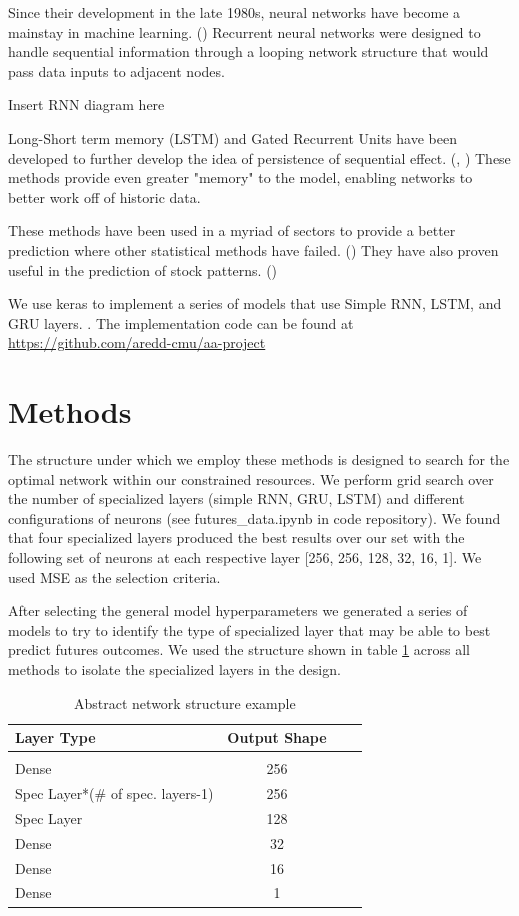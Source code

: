 \documentclass[twoside,11pt]{article}
\begin{document}
Since their development in the late 1980s, neural networks have become a mainstay in machine learning. (\cite{Schmidhuber2015}) Recurrent neural networks were designed to handle sequential information through a looping network structure that would pass data inputs to adjacent nodes. 

Insert RNN diagram here

Long-Short term memory (LSTM) and Gated Recurrent Units have been developed to further develop the idea of persistence of sequential effect. (\cite{Hochreiter1997}, \cite{Chung}) These methods provide even greater "memory" to the model, enabling networks to better work off of historic data. 

These methods have been used in a myriad of sectors to provide a better prediction where other statistical methods have failed. (\cite{Ugurlu2018}) They have also proven useful in the prediction of stock patterns. (\cite{YoungohcYoon}) 

We use keras to implement a series of models that use Simple RNN, LSTM, and GRU layers. \cite{chollet2015keras}. The implementation code can be found at \url{https://github.com/aredd-cmu/aa-project}

\section{Methods} \label{Methods}

The structure under which we employ these methods is designed to search for the optimal network within our constrained resources. We perform grid search over the number of specialized layers (simple RNN, GRU, LSTM) and different configurations of neurons (see futures\_data.ipynb in code repository). We found that four specialized layers produced the best results over our set with the following set of neurons at each respective layer [256, 256, 128, 32, 16, 1]. We used MSE as the selection criteria.

After selecting the general model hyperparameters we generated a series of models to try to identify the type of specialized layer that may be able to best predict futures outcomes. We used the structure shown in table \ref{tab:networkstructure} across all methods to isolate the specialized layers in the design.

\begin{table}[htbp]
	\centering
	\begin{tabular}{lclc}
		Layer Type & Output Shape \\
		\hline \\[-11pt]
		Dense & 256 \\
		Spec Layer*(\# of spec. layers-1) & 256\\
		Spec Layer & 128\\
		Dense & 32\\
		Dense & 16\\
		Dense & 1\\
		\hline
	\end{tabular}
	\label{tab:networkstructure}
	\caption{Abstract network structure example}
\end{table}
\end{document}
